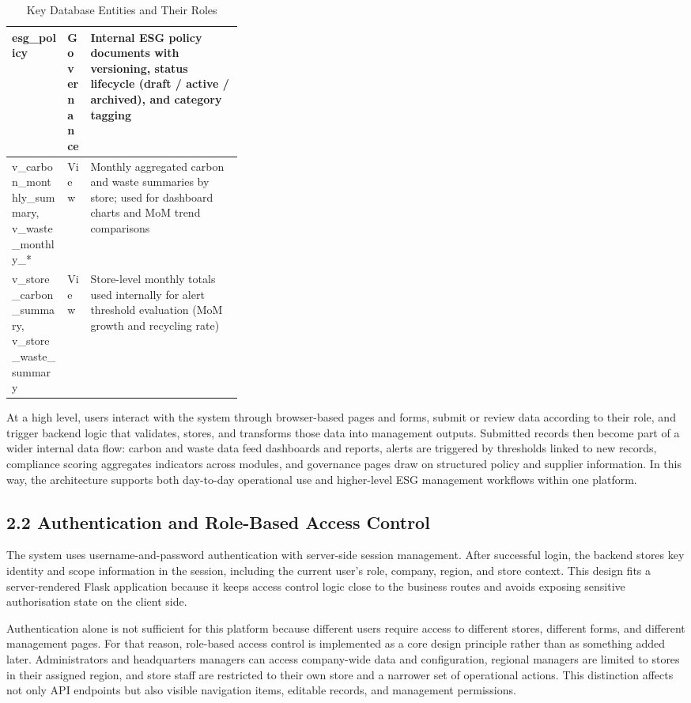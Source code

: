 \documentclass[10pt,a4paper]{article}
\begin{document}
\begin{table}[h]
\begin{tabularx}{\linewidth}{@{}p{0.24\linewidth}p{0.10\linewidth}X@{}}
esg\_policy & Governance & Internal ESG policy documents with versioning, status lifecycle (draft / active / archived), and category tagging \\
\midrule
v\_carbon\_monthly\_summary, v\_waste\_monthly\_*  & View & Monthly aggregated carbon and waste summaries by store; used for dashboard charts and MoM trend comparisons \\
v\_store\_carbon\_summary, v\_store\_waste\_summary & View & Store-level monthly totals used internally for alert threshold evaluation (MoM growth and recycling rate) \\
\bottomrule
\end{tabularx}
\caption{Key Database Entities and Their Roles}
\end{table}

At a high level, users interact with the system through browser-based pages and forms, submit or review data according to their role, and trigger backend logic that validates, stores, and transforms those data into management outputs. Submitted records then become part of a wider internal data flow: carbon and waste data feed dashboards and reports, alerts are triggered by thresholds linked to new records, compliance scoring aggregates indicators across modules, and governance pages draw on structured policy and supplier information. In this way, the architecture supports both day-to-day operational use and higher-level ESG management workflows within one platform.

\subsection*{2.2 Authentication and Role-Based Access Control}
The system uses username-and-password authentication with server-side session management. After successful login, the backend stores key identity and scope information in the session, including the current user's role, company, region, and store context. This design fits a server-rendered Flask application because it keeps access control logic close to the business routes and avoids exposing sensitive authorisation state on the client side.

Authentication alone is not sufficient for this platform because different users require access to different stores, different forms, and different management pages. For that reason, role-based access control is implemented as a core design principle rather than as something added later. Administrators and headquarters managers can access company-wide data and configuration, regional managers are limited to stores in their assigned region, and store staff are restricted to their own store and a narrower set of operational actions. This distinction affects not only API endpoints but also visible navigation items, editable records, and management permissions.
\end{document}
